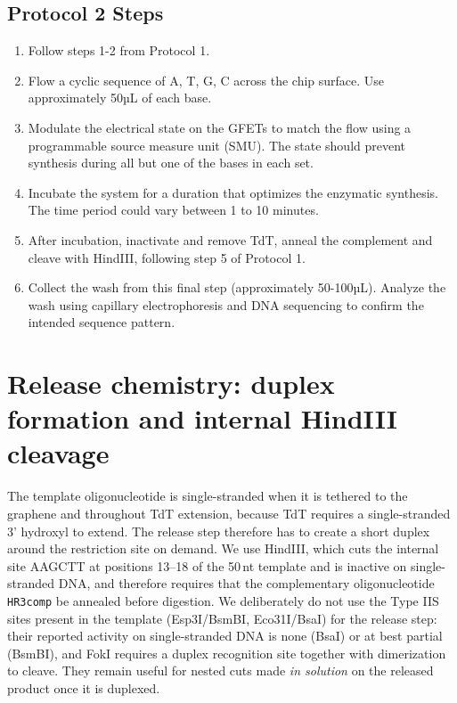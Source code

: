 \documentclass[11pt]{article}
\begin{document}
\subsection*{Protocol 2 Steps}
\begin{enumerate}
    \item Follow steps 1-2 from Protocol 1.
    \item Flow a cyclic sequence of A, T, G, C across the chip surface. Use approximately 50µL of each base.
    \item Modulate the electrical state on the GFETs to match the flow using a programmable source measure unit (SMU). The state should prevent synthesis during all but one of the bases in each set.
    \item Incubate the system for a duration that optimizes the enzymatic synthesis. The time period could vary between 1 to 10 minutes.
    \item After incubation, inactivate and remove TdT, anneal the complement and cleave with HindIII, following step 5 of Protocol 1.
    \item Collect the wash from this final step (approximately 50-100µL). Analyze the wash using capillary electrophoresis and DNA sequencing to confirm the intended sequence pattern.
\end{enumerate}

\section*{Release chemistry: duplex formation and internal HindIII cleavage}

The template oligonucleotide is single-stranded when it is tethered to the graphene and throughout TdT extension, because TdT requires a single-stranded 3' hydroxyl to extend.
The release step therefore has to create a short duplex around the restriction site on demand.
We use HindIII, which cuts the internal site AAGCTT at positions 13--18 of the 50\,nt template and is inactive on single-stranded DNA, and therefore requires that the complementary oligonucleotide \texttt{HR3comp} be annealed before digestion.
We deliberately do not use the Type IIS sites present in the template (Esp3I/BsmBI, Eco31I/BsaI) for the release step: their reported activity on single-stranded DNA is none (BsaI) or at best partial (BsmBI), and FokI requires a duplex recognition site together with dimerization to cleave.
They remain useful for nested cuts made \emph{in solution} on the released product once it is duplexed.
\end{document}
